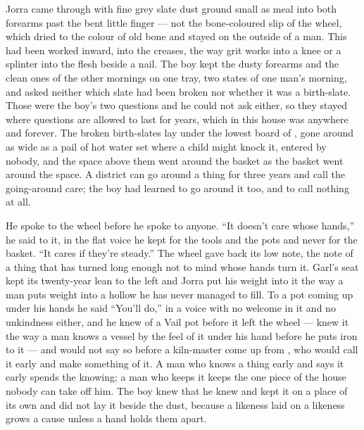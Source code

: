 Jorra came through with fine grey slate dust ground small as meal into both forearms past the bent little finger --- not the bone-coloured slip of the wheel, which dried to the colour of old bone and stayed on the outside of a man. This had been worked inward, into the creases, the way grit works into a knee or a splinter into the flesh beside a nail. The boy kept the dusty forearms and the clean ones of the other mornings on one tray, two states of one man's morning, and asked neither which slate had been broken nor whether it was a birth-slate. Those were the boy's two questions and he could not ask either, so they stayed where questions are allowed to last for years, which in this house was anywhere and forever. The broken birth-slates lay under the lowest board of , gone around as wide as a pail of hot water set where a child might knock it, entered by nobody, and the space above them went around the basket as the basket went around the space. A district can go around a thing for three years and call the going-around care; the boy had learned to go around it too, and to call nothing at all.

He spoke to the wheel before he spoke to anyone. “It doesn't care whose hands,” he said to it, in the flat voice he kept for the tools and the pots and never for the basket. “It cares if they're steady.” The wheel gave back its low note, the note of a thing that has turned long enough not to mind whose hands turn it. Garl's seat kept its twenty-year lean to the left and Jorra put his weight into it the way a man puts weight into a hollow he has never managed to fill. To a pot coming up under his hands he said “You'll do,” in a voice with no welcome in it and no unkindness either, and he knew  of a Vail pot before it left the wheel --- knew it the way a man knows a vessel by the feel of it under his hand before he puts iron to it --- and would not say so before a kiln-master come up from , who would call it early and make something of it. A man who knows a thing early and says it early spends the knowing; a man who keeps it keeps the one piece of the house nobody can take off him. The boy knew that he knew and kept it on a place of its own and did not lay it beside the dust, because a likeness laid on a likeness grows a cause unless a hand holds them apart.

